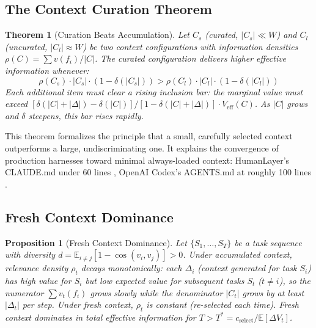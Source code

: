 \documentclass[11pt, a4paper, logo, copyright]{googledeepmind}
\newtheorem{theorem}{Theorem}[section]
\newtheorem{proposition}{Proposition}[section]
\begin{document}
\subsection{The Context Curation Theorem}

\begin{theorem}[Curation Beats Accumulation]
\label{thm:curation}
Let $C_s$ (curated, $|C_s| \ll W$) and $C_l$ (uncurated, $|C_l| \approx W$) be two context configurations with information densities $\rho(C) = \sum v(f_i) / |C|$. The curated configuration delivers higher effective information whenever:
\begin{equation}
    \rho(C_s) \cdot |C_s| \cdot (1 - \delta(|C_s|)) > \rho(C_l) \cdot |C_l| \cdot (1 - \delta(|C_l|))
\end{equation}
Each additional item must clear a rising inclusion bar: the marginal value must exceed $[\delta(|C| + |\Delta|) - \delta(|C|)] / [1 - \delta(|C| + |\Delta|)] \cdot V_{\text{eff}}(C)$. As $|C|$ grows and $\delta$ steepens, this bar rises rapidly.
\end{theorem}

This theorem formalizes the principle that a small, carefully selected context outperforms a large, undiscriminating one. It explains the convergence of production harnesses toward minimal always-loaded context: HumanLayer's CLAUDE.md under 60 lines \citep{humanlayer2025skillissue}, OpenAI Codex's AGENTS.md at roughly 100 lines \citep{openai2025codex}.

\subsection{Fresh Context Dominance}

\begin{proposition}[Fresh Context Dominance]
\label{prop:fresh-context}
Let $\{S_1, \ldots, S_T\}$ be a task sequence with diversity $d = \mathbb{E}_{i \neq j}[1 - \cos(v_i, v_j)] > 0$. Under accumulated context, relevance density $\rho_t$ decays monotonically: each $\Delta_i$ (context generated for task $S_i$) has high value for $S_i$ but low expected value for subsequent tasks $S_t$ ($t \neq i$), so the numerator $\sum v_t(f_i)$ grows slowly while the denominator $|C_t|$ grows by at least $|\Delta_t|$ per step. Under fresh context, $\rho_t$ is constant (re-selected each time). Fresh context dominates in total effective information for $T > T^* = c_{\text{select}} / \mathbb{E}[\Delta V_t]$.
\end{proposition}
\end{document}
